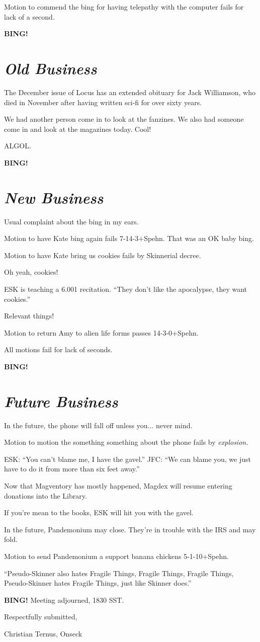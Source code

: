 \documentclass[10pt]{article}
\newcommand{\bing}{{\bf BING!} }
\newcommand{\goto}[1]{\bing \vskip 12pt \section*{{\em{#1}}}}
\begin{document}
Motion to commend the bing for having telepathy with the computer fails for lack of a second.

\goto{Old Business}

The December issue of Locus has an extended obituary for Jack Williamson, who died in November after having written sci-fi for over sixty years.

We had another person come in to look at the fanzines.  We also had someone come in and look at the magazines today.  Cool! 

ALGOL.

\goto{New Business}

Usual complaint about the bing in my ears.

Motion to have Kate bing again fails 7-14-3+Spehn.  That was an OK baby bing.

Motion to have Kate bring us cookies fails by Skinnerial decree.

Oh yeah, cookies!

ESK is teaching a 6.001 recitation.  ``They don't like the apocalypse, they want cookies.''

Relevant things!

Motion to return Amy to alien life forms passes 14-3-0+Spehn.

All motions fail for lack of seconds.

\goto{Future Business}

In the future, the phone will fall off unless you... never mind.

Motion to motion the something something about the phone fails by \emph{explosion.}

ESK: ``You can't blame me, I have the gavel.''
JFC: ``We can blame you, we just have to do it from more than six feet away.''

Now that Magventory has mostly happened, Magdex will resume entering donations into the Library.

If you're mean to the books, ESK will hit you with the gavel.

In the future, Pandemonium may close.  They're in trouble with the IRS and may fold.

Motion to send Pandemonium a support banana chickens 5-1-10+Spehn.

``Pseudo-Skinner also hates Fragile Things, Fragile Things, Fragile Things, Pseudo-Skinner hates Fragile Things, just like Skinner does.''

\bing
\noindent
Meeting adjourned, 1830 SST.

\vspace{18pt}

\centerline{Respectfully submitted,}
\centerline{Christian Ternus, Onseck}
\end{document}
